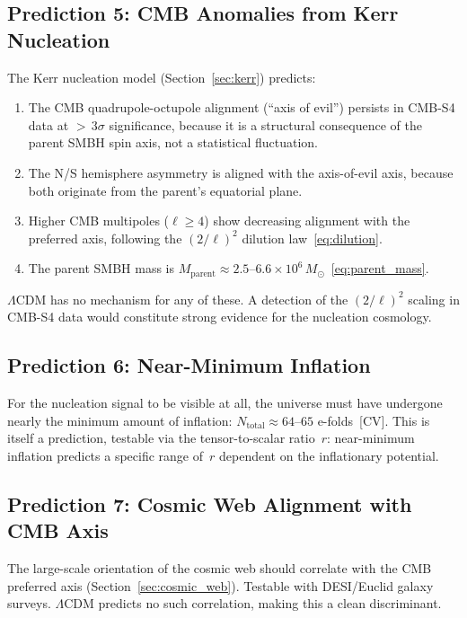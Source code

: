 \documentclass[11pt,a4paper]{article}
\theoremstyle{plain}
\theoremstyle{definition}
\theoremstyle{remark}
\begin{document}
\subsection{Prediction 5: CMB Anomalies from Kerr Nucleation}
\label{sec:pred_cmb}

The Kerr nucleation model (Section~\ref{sec:kerr}) predicts:

\begin{enumerate}[nosep,label=(\alph*)]
\item The CMB quadrupole-octupole alignment (``axis of evil'')
  persists in CMB-S4 data at ${>}\,3\sigma$ significance, because it
  is a structural consequence of the parent SMBH spin axis, not a
  statistical fluctuation.
\item The N/S hemisphere asymmetry is aligned with the axis-of-evil
  axis, because both originate from the parent's equatorial plane.
\item Higher CMB multipoles ($\ell \geq 4$) show decreasing alignment
  with the preferred axis, following the $(2/\ell)^2$ dilution
  law~\eqref{eq:dilution}.
\item The parent SMBH mass is $M_{\mathrm{parent}} \approx
  2.5$--$6.6 \times 10^6\,M_\odot$~\eqref{eq:parent_mass}.
\end{enumerate}

\noindent
$\Lambda$CDM has no mechanism for any of these. A detection of
the $(2/\ell)^2$ scaling in CMB-S4 data would constitute strong
evidence for the nucleation cosmology.

\subsection{Prediction 6: Near-Minimum Inflation}
\label{sec:pred_inflation}

For the nucleation signal to be visible at all, the universe must have
undergone nearly the minimum amount of inflation:
$N_{\mathrm{total}} \approx 64$--$65$ e-folds~[CV]. This is itself a
prediction, testable via the tensor-to-scalar ratio~$r$: near-minimum
inflation predicts a specific range of~$r$ dependent on the
inflationary potential.

\subsection{Prediction 7: Cosmic Web Alignment with CMB Axis}
\label{sec:pred_web}

The large-scale orientation of the cosmic web should correlate with the
CMB preferred axis (Section~\ref{sec:cosmic_web}). Testable with
DESI/Euclid galaxy surveys. $\Lambda$CDM predicts no such
correlation, making this a clean discriminant.
\end{document}
